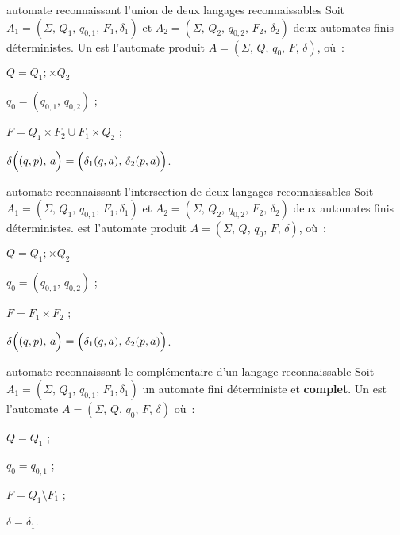 \begin{adjustwidth}{-3cm}{-3cm}
\begin{definition}{2.20}{automate reconnaissant l'union de deux langages reconnaissables}
    Soit $A_1 = (\Sigma,\, Q_1,\, q_{0,1},\, F_1, \delta_1)$ et $A_2 = (\Sigma,\, Q_2,\, q_{0,2},\, F_2,\, \delta_2 )$ deux automates finis déterministes. Un  est l'automate produit $A = (\Sigma,\, Q,\, q_0,\, F,\, \delta)$, où~:
    \begin{enumeratebf}
        \item $Q = Q_1 ;\times Q_2 $
        \item $q_0 = (q_{0,1},\, q_{0,2})$ ;
        \item $F = Q_1 \times F_2 \cup F_1 \times Q_2$ ;
        \item $\delta\Bigl((q,p),\, a\Bigr) = \Bigl(\delta_1(q,a),\, \delta_2(p,a)\Bigr)$.
    \end{enumeratebf}
\end{definition}

\begin{definition}{2.21}{automate reconnaissant l'intersection de deux langages reconnaissables}
    Soit $A_1 = (\Sigma,\, Q_1,\, q_{0,1},\, F_1, \delta_1)$ et $A_2 = (\Sigma,\, Q_2,\, q_{0,2},\, F_2,\, \delta_2 )$ deux automates finis déterministes.  est l'automate produit $A = (\Sigma,\, Q,\, q_0,\, F,\, \delta)$, où~:
    \begin{enumeratebf}
        \item $Q = Q_1 ;\times Q_2 $
        \item $q_0 = (q_{0,1},\, q_{0,2})$ ;
        \item $F = F_1 \times F_2$ ;
        \item $\delta\Bigl((q,p),\, a\Bigr) = \Bigl(\delta_1(q,a),\, \delta_2(p,a)\Bigr)$.
    \end{enumeratebf}
\end{definition}

\begin{definition}{2.22}{automate reconnaissant le complémentaire d'un langage reconnaissable}
    Soit $A_1 = (\Sigma,\, Q_1,\, q_{0,1},\, F_1, \delta_1)$ un automate fini déterministe et \textbf{complet}. Un  est l'automate $A = (\Sigma,\, Q,\, q_0,\, F,\, \delta)$ où~:
    \begin{enumeratebf}
        \item $Q = Q_1$ ;
        \item $q_0 = q_{0,1}$ ;
        \item $F = Q_1 \setminus F_1$ ;
        \item $\delta = \delta_1$.
    \end{enumeratebf}
\end{definition}


\end{adjustwidth}
